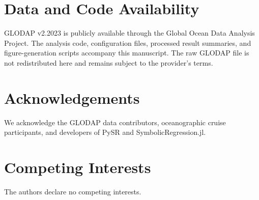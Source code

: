 \section*{Data and Code Availability}
GLODAP v2.2023 is publicly available through the Global Ocean Data Analysis Project. The analysis code, configuration files, processed result summaries, and figure-generation scripts accompany this manuscript. The raw GLODAP file is not redistributed here and remains subject to the provider's terms.

\section*{Acknowledgements}
We acknowledge the GLODAP data contributors, oceanographic cruise participants, and developers of PySR and SymbolicRegression.jl.

\section*{Competing Interests}
The authors declare no competing interests.

